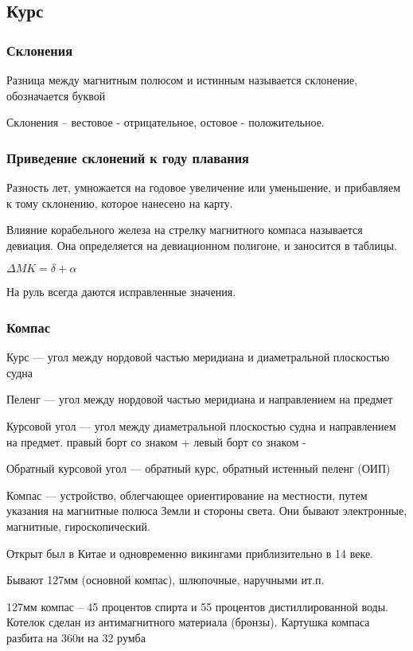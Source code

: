 \documentclass{article}        %
\begin{document}
\subsection{Курс}
\subsubsection{Склонения}
Разница между магнитным полюсом и истинным называется склонение, обозначается буквой \delta

Склонения -- вестовое - отрицательное, остовое - положительное. 

\subsubsection{Приведение склонений к году плавания}
Разность лет, умножается на годовое увеличение или уменьшение, и прибавляем к тому склонению, которое нанесено на карту.

Влияние корабельного железа на стрелку магнитного компаса называется девиация. Она определяется на девиационном полигоне, и заносится в таблицы.

$\Delta MK = \delta + \alpha$ 

На руль всегда даются исправленные значения.

\subsubsection{Компас}

Курс --- угол между нордовой частью меридиана и диаметральной плоскостью судна

Пеленг --- угол между нордовой частью меридиана и направлением на предмет

Курсовой угол --- угол между диаметральной плоскостью судна и направлением на предмет.
	правый борт со знаком + 
	левый борт со знаком - 

Обратный курсовой угол --- обратный курс, обратный истенный пеленг (ОИП)

Компас --- устройство, облегчающее ориентирование на местности, путем указания на магнитные полюса Земли и стороны света. Они бывают электронные, магнитные, гироскопический.

Открыт был в Китае и одновременно викингами приблизительно в 14 веке.

Бывают 127мм (основной компас), шлюпочные, наручными ит.п.

127мм компас -- 45 процентов спирта и 55 процентов дистиллированной воды. Котелок
	сделан из антимагнитного материала (бронзы). 
	Картушка компаса разбита на 360\degree и на 32 румба
\end{document}
